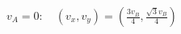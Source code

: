 \documentclass[border=2.5pt]{standalone}
\begin{document}
$\displaystyle v_A=0:\quad (v_x,v_y)=\left(\frac{3v_B}4,\frac{\sqrt3v_B}4\right)$
\end{document}
